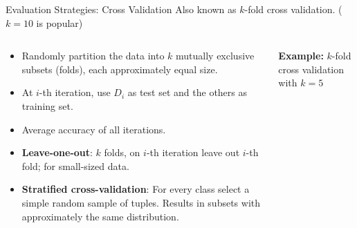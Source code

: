 \begin{frame}{Evaluation Strategies: Cross Validation}
	Also known as $k$-fold cross validation. ($k=10$ is popular)
	\begin{columns}[T]
		\begin{column}[T]{0.5\textwidth}
			\begin{itemize}
				\item Randomly partition the data into $k$ mutually exclusive subsets (folds), each approximately equal size.
				\item At $i$-th iteration, use $D_i$ as test set and the others as training set.
				\item Average accuracy of all iterations.
				\item \textbf{Leave-one-out}: $k$ folds, on $i$-th iteration leave out $i$-th fold; for small-sized data.
				\item \textbf{Stratified cross-validation}: For every class select a simple random sample of tuples. Results in subsets with approximately the same distribution.
			\end{itemize}

		\end{column}

		\begin{column}[T]{0.5\textwidth}
			\centering
			\vspace{.3em}
			\textbf{Example:} $k$-fold cross validation with $k=5$\\\medskip


\end{column}
\end{columns}
\end{frame}
